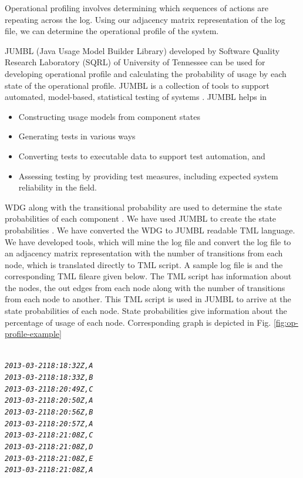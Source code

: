 \begin{enumerate}
Operational profiling involves determining which sequences of actions are repeating across the log. Using our adjacency matrix representation of the log file, we can determine the operational profile of the system. 

JUMBL (Java Usage Model Builder Library) developed by Software Quality Research Laboratory (SQRL) of University of Tennessee \cite{jumbl} can be used for developing operational profile and calculating the probability of usage by each state of the operational profile. JUMBL is a collection of tools to support automated, model-based, statistical testing of systems \cite{jug}. JUMBL helps in

\begin{itemize}
\item Constructing usage models from component states
\item Generating tests in various ways
\item Converting tests to executable data to support test automation, and
\item Assessing testing by providing test measures, including expected system reliability in the field.
\end{itemize}

WDG along with the transitional probability are used to determine the state probabilities of each component . We have used JUMBL to create the state probabilities \cite{anil}. We have converted the WDG to JUMBL readable TML \cite{tug} language. We have developed tools, which will mine the log file and convert the log file to an adjacency matrix representation with the number of transitions from each node, which is translated directly to TML script. A sample log file is and the corresponding TML fileare given below. The TML script has information about the nodes, the out edges from each node along with the number of transitions from each node to another. This TML script is used in JUMBL to arrive at the state probabilities of each node. State probabilities give information about the percentage of usage of each node. Corresponding graph is depicted in Fig. \ref{fig:op-profile-example}



\begin{alltt}
\small{ \emph{
2013-03-21 18:18:32Z,A
2013-03-21 18:18:33Z,B
2013-03-21 18:20:49Z,C
2013-03-21 18:20:50Z,A
2013-03-21 18:20:56Z,B
2013-03-21 18:20:57Z,A
2013-03-21 18:21:08Z,C
2013-03-21 18:21:08Z,D
2013-03-21 18:21:08Z,E
2013-03-21 18:21:08Z,A
}}
\end{alltt}


\end{enumerate}
